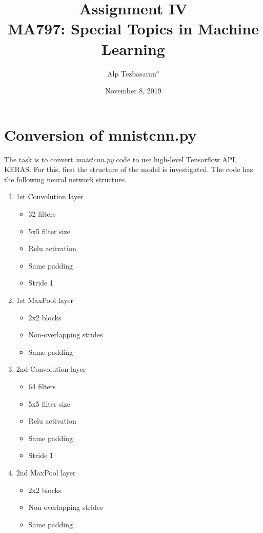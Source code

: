 \documentclass[11pt]{article}
\title{ \bf{Assignment IV \\ MA797: Special Topics in Machine Learning}}
\author{Alp Tezbasaran$^{a}$}
\affil{\textit{$^{a}$Department of Nuclear Engineering NCSU, alptezbasaran@ncsu.edu}}
\date{November 8, 2019}
\begin{document}
\maketitle

\section{Conversion of mnistcnn.py}

The task is to convert \emph{mnistcnn.py} code to use high-level Tensorflow API, KERAS. For this, first the structure of the model is investigated. The code has the following neural network structure.\medskip


\begin{enumerate}
    \item 1st Convolution layer
    \begin{itemize}
        \item 32 filters
        \item 5x5 filter size
        \item Relu activation
        \item Same padding
        \item Stride 1
    \end{itemize}
    \item 1st MaxPool layer
    \begin{itemize}
        \item 2x2 blocks
        \item Non-overlapping strides
        \item Same padding
    \end{itemize}
    \item 2nd Convolution layer
    \begin{itemize}
        \item 64 filters
        \item 5x5 filter size
        \item Relu activation
        \item Same padding
        \item Stride 1
    \end{itemize}
    \item 2nd MaxPool layer
    \begin{itemize}
        \item 2x2 blocks
        \item Non-overlapping strides
        \item Same padding
    \end{itemize}

\end{enumerate}
\end{document}
